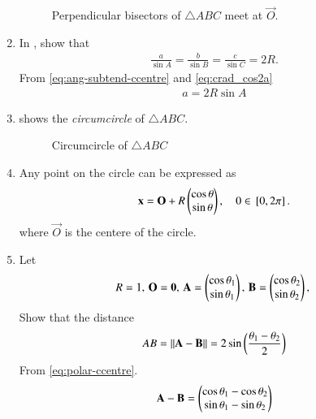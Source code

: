 \begin{enumerate}[label=\thesubsection.\arabic*.,ref=\thesubsection.\theenumi]
\begin{figure}[!ht]
\begin{center}
		\resizebox{0.6\columnwidth}{!}{}
	\end{center}
	\caption{ Perpendicular bisectors of $\triangle ABC$ meet at $\vec{O}$.}
	\label{fig:tri_ccentre}	
\end{figure}
\item In
	,
show that 
\begin{align}
\label{eq:tri_crad_R}
\frac{a}{\sin A} = \frac{b}{\sin B} = \frac{c}{\sin C} = 2R.
\end{align}
%
%
\solution
From 
\eqref{eq:ang-subtend-ccentre}
and 
\eqref{eq:crad_cos2a}
  \begin{align}
	  a = 2R \sin A
  \end{align}
  \item 
  shows the {\em circumcircle} of $\triangle ABC$.
\begin{figure}[!ht]
	\begin{center}
		\resizebox{0.6\columnwidth}{!}{}
	\end{center}
	\caption{Circumcircle of $\triangle ABC$}
	\label{fig:tri_ccircle-ang}	
\end{figure}
\item Any point on the circle can be expressed as 
  \begin{align}
	  \mathbf{x} = \mathbf{O} + R\begin{pmatrix}\cos \theta \\ \sin \theta\end{pmatrix}, \quad 0 \in {}\left[0, 2\pi\right]
\label{eq:polar-ccentre}.
  \end{align}
  where $\vec{O}$ is the centere of the circle.
  \item Let
  \begin{align}
	  R = 1,\,
	  \mathbf{O} = \mathbf{0} ,\,
	  \mathbf{A} = \begin{pmatrix}\cos \theta_1 \\ \sin \theta_1\end{pmatrix},\,
	  \mathbf{B} = \begin{pmatrix}\cos \theta_2 \\ \sin \theta_2\end{pmatrix},\,
  \end{align}
Show that the distance
  \begin{align}
	  AB = \left\lVert\mathbf{A}-\mathbf{B}\right\rVert = 
	   2 \sin \left(\frac{\theta_1-\theta_2}{2}\right)
\label{eq:norm-polar-ccentre}
  \end{align}
  \solution 
  From 
\eqref{eq:polar-ccentre}.
  \begin{align}
	  \vec{A}-\vec{B} &= 
\myvec{\cos \theta_1-\cos \theta_2 \\ \sin \theta_1-\sin \theta_2}
\\

\end{align}
\end{enumerate}

